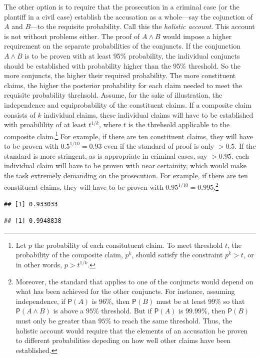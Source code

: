 \documentclass[10pt,dvipsnames,enabledeprecatedfontcommands]{scrartcl}
\newcommand{\et}{\wedge}
\newcommand{\pr}[1]{\mathsf{P}(#1)}
\begin{document}
The other option is to require that the prosecution in a criminal case
(or the plantiff in a civil case) establish the accusation as a
whole---say the cojunction of \(A\) and \(B\)---to the requisite
probability. Call this the \textit{holistic account}. This account is
not without problems either. The proof of \(A\et B\) would impose a
higher requirement on the separate probabilities of the conjuncts. If
the conjunction \(A\et B\) is to be proven with at least 95\%
probability, the individual conjuncts should be established with
probability higher than the 95\% threshold. So the more conjuncts, the
higher their required probability. The more constituent claims, the
higher the posterior probability for each claim needed to meet the
requisite probability threhsold. Assume, for the sake of illustration,
the independence and equiprobability of the constituent claims. If a
composite claim consists of \(k\) individual claims, these individual
claims will have to be established with proabilility of at least
\(t^{1/k}\), where \(t\) is the threhsold applicable to the composite
claim.\footnote{Let $p$ the probability of each consitutuent claim. To meet threshold $t$, the probability of the composite claim, $p^k$, should satisfy the constraint $p^k>t$, or in other words, $p>t^{1/k}$.}
For example, if there are ten constituent claims, they will have to be
proven with \(0.5^{1/10}=0.93\) even if the standard of proof is only
\(>0.5\). If the standard is more stringent, as is appropriate in
criminal cases, say \(>0.95\), each individual claim will have to be
proven with near certainity, which would make the task extremely
demanding on the prosecution. For example, if there are ten constituent
claims, they will have to be proven with
\(0.95^{1/10}=0.995\).\footnote{Moreover, the standard that applies to one of the conjuncts would depend on what has been achieved for the other conjuncts. For instance, assuming independence, if  $\pr{A}$ is $96\%$, then $\pr{B}$ must be at least $99\%$ so that $\pr{A\et B}$ is above a $95\%$ threshold. But if $\pr{A}$ is $99.99\%$, then $\pr{B}$ must only be greater than $95\%$ to reach the same threshold. Thus, the holistic account would require that the elements of an accusation be proven to different probabilities depeding on how well other claims have been established.}

\begin{verbatim}
## [1] 0.933033
\end{verbatim}

\begin{verbatim}
## [1] 0.9948838
\end{verbatim}
\end{document}
